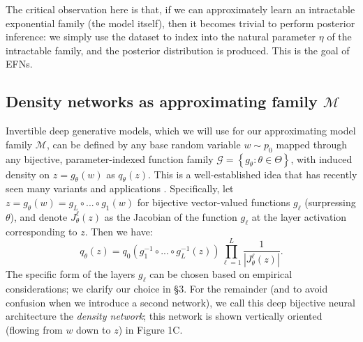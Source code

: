 \documentclass{article}
\begin{document}
The critical observation here is that, if we can approximately learn an intractable exponential family (the model itself), then it becomes trivial to perform posterior inference: we simply use the dataset to index into the natural parameter $\eta$ of the intractable family, and the posterior distribution is produced.  This is the goal of EFNs.

\subsection{Density networks as approximating family $\mathcal{M}$}

Invertible deep generative models, which we will use for our approximating model family $\mathcal{M}$, can be defined by any base random variable $w\sim p_0$ mapped through any bijective, parameter-indexed function family  $\mathcal{G} = \left\{g_\theta: \theta \in \Theta\right\}$, with induced density on $z=g_\theta(w)$ as $q_\theta(z)$.  This is a well-established idea that has recently seen many variants and applications \citep{mackay1997density, baird2005one, tabak2010density, rippel2013high, uria2013rnade, rezende2015variational, dinh2016density, papamakarios2017masked, jacobsen2018revnet}.  Specifically, let $z = g_\theta(w) = g_L \circ ... \circ g_1(w)$ for bijective vector-valued functions $g_\ell$ (surpressing $\theta$), and denote $J^\ell_\theta(z)$ as the Jacobian of the function $g_\ell$ at the layer activation corresponding to $z$.  Then we have:
{\small 
\begin{equation}
q_\theta(z) = q_0\left( g_1^{-1} \circ ... \circ g_L^{-1}(z) \right) \prod_{\ell=1}^L \frac{1}{| J^\ell_\theta(z) |}.
\label{eq:4}
\end{equation}}
The specific form of the layers $g_\ell$ can be chosen based on empirical considerations; we clarify our choice in \S3.  For the remainder (and to avoid confusion when we introduce a second network), we call this deep bijective neural architecture the \emph{density network}; this network is shown vertically oriented (flowing from $w$ down to $z$) in Figure 1C.
\end{document}
